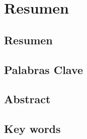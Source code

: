 \chapter*{Resumen}

\section*{Resumen}
\todo[inline]{ \currentname}
\section*{Palabras Clave}
\todo[inline]{ \currentname}
\newpage

\section*{Abstract}
\todo[inline]{ \currentname}
\section*{Key words}
\todo[inline]{ \currentname}